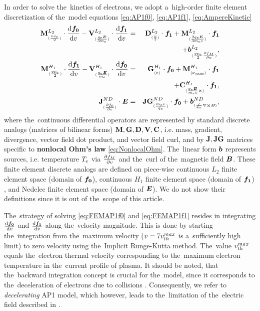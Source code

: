 In order to solve the~kinetics of electrons, we adopt a~high-order 
finite element discretization 
\cite{Dobrev_Kolev_Rieben-High-order_curvilinear_finite_element_methods_for_Lagrangian_hydrodynamics, mfem-library} 
of the~model equations \eqref{eq:AP1f0}, \eqref{eq:AP1f1}, 
\eqref{eq:AmpereKinetic}
\begin{eqnarray}
  \mathbf{M}^{L_2}_{_{(\frac{v\nu_{e}}{2})}}\cdot\frac{\text{d} \boldsymbol{f_0}}{\text{d} v} 
  - \mathbf{V}^{L_2}_{_{(\frac{q_e\boldsymbol{E}}{3m_e})}}\cdot\frac{\text{d} {\boldsymbol{f_1}}}{\text{d} v}
  &=&
  \mathbf{D}^{L_2}_{_{(\frac{v}{3})}}\cdot{\boldsymbol{f_1}} 
  + \mathbf{M}^{L_2}_{_{(\frac{2q_e\boldsymbol{E}}{3m_ev})}}\cdot{\boldsymbol{f_1}}
  \nonumber \\ 
  &&+ \boldsymbol{b}^{L_2}_{_{(\frac{v\nu_{e}}{2}\frac{\partial{f_M}}{\partial{v}})}}, 
  \label{eq:FEMAP1f0}
  \\
  \mathbf{M}^{H_1}_{_{(\frac{v\nu_{e}}{2})}}\cdot\frac{\text{d} {\boldsymbol{f_1}}}{\text{d} v}
  - \mathbf{V}^{H_1}_{_{(\frac{q_e\boldsymbol{E}}{m_e})}}\cdot\frac{\text{d} \boldsymbol{f_0}}{\text{d} v}
   &=& 
  \mathbf{G}^{H_1}_{_{(v)}}\cdot\boldsymbol{f_0} 
  + \mathbf{M}^{H_1}_{_{(\nu_{scat})}}\cdot{\boldsymbol{f_1}} 
  \nonumber \\
  && + \mathbf{C}^{H_1}_{_{(\frac{q_e\boldsymbol{B}}{m_e c}\boldsymbol{\times})}}\cdot{\boldsymbol{f_1}}
  ,
  \label{eq:FEMAP1f1}\\
  \mathbf{J}^{ND}_{_{(\frac{\partial{f_0}}{\partial{v}})}}\cdot\boldsymbol{E} 
  &=& 
  \mathbf{JG}^{ND}_{_{(\frac{m_ev}{q_e})}}\cdot\boldsymbol{f_0}
  + \boldsymbol{b}^{ND}_{_{(\frac{c}{4\pi} \nabla\boldsymbol{\times}\boldsymbol{B})}} 
  ,
  \nonumber \\
  \label{eq:FEMAmpereKinetic}
\end{eqnarray}
where the~continuous differential operators are represented by standard 
discrete analogs (matrices of bilinear forms) 
$\mathbf{M}, \mathbf{G}, \mathbf{D}, \mathbf{V}, \mathbf{C}$, i.e. mass, gradient, 
divergence, vector field dot product, and vector field curl, and
by $\mathbf{J}, \mathbf{JG}$ matrices specific to {\bf nonlocal Ohm's law} 
\eqref{eq:NonlocalOhm}. The~linear form $\boldsymbol{b}$ represents sources, i.e.
temperature $T_e$ via $\frac{\partial{f_M}}{\partial{v}}$ and the~curl of 
the~magnetic field $\boldsymbol{B}$. These finite element discrete analogs are defined
on piece-wise continuous $L_2$ finite element space (domain of $\boldsymbol{f_0}$),
continuous $H_1$ finite element space (domain of ${\boldsymbol{f_1}}$) 
\cite{Dobrev_Kolev_Rieben-High-order_curvilinear_finite_element_methods_for_Lagrangian_hydrodynamics}, 
and Nedelec finite element space (domain of $\boldsymbol{E}$). We do not show their
definitions since it is out of the~scope of this article. 

The~strategy of solving 
\eqref{eq:FEMAP1f0} and \eqref{eq:FEMAP1f1} resides in integrating 
$\frac{\text{d} \boldsymbol{f_0}}{\text{d} v}$
and $\frac{\text{d} {\boldsymbol{f_1}}}{\text{d} v}$ along the~velocity magnitude. 
This is done by starting the~integration
from the~maximum  velocity 
($v = 7 v_{th}^{max}$ is a~sufficiently high limit) 
to zero velocity using the~Implicit Runge-Kutta method. The~value
$v_{th}^{max}$ equals the~electron thermal velocity corresponding to the~maximum 
electron temperature in the~current profile of plasma.
It should be noted, that the~backward integration concept is crucial for 
the~model, since it corresponds to the~deceleration of electrons due to 
collisions \cite{Touati_2014}. Consequently, we refer to 
\textit{decelerating} AP1 model, which however, leads to the~limitation of 
the~electric field described in . 

